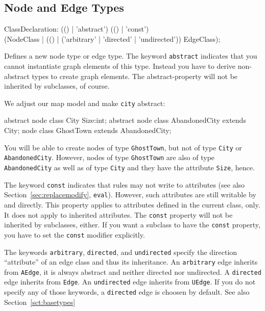 \subsection{Node and Edge Types}
\begin{rail}
  ClassDeclaration: (() | 'abstract') (() | 'const') \\
    (NodeClass | (() | ('arbitrary' | 'directed' | 'undirected')) EdgeClass);
\end{rail}
Defines a new node type or edge type.
The keyword \texttt{abstract} indicates that you cannot instantiate graph elements of this type.
Instead you have to derive non-abstract types to create graph elements.
The abstract-property will not be inherited by subclasses, of course.

\begin{example}
We adjust our map model and make \texttt{city} abstract:
\begin{grgen}
abstract node class City {
  Size:int;
}
abstract node class AbandonedCity extends City;
node class GhostTown extends AbandonedCity;
\end{grgen}
You will be able to create nodes of type \texttt{GhostTown}, but not of type \texttt{City} or \texttt{AbandonedCity}. However, nodes of type \texttt{GhostTown} are also of type \texttt{AbandonedCity} as well as of type \texttt{City} and they have the attribute \texttt{Size}, hence.
\end{example}
The keyword \texttt{const} indicates that rules may not write to attributes (see also Section~\ref{sec:replacemodify}, \texttt{eval}). However, such attributes are still writable by \LibGr{} and \GrShell{} directly. This property applies to attributes defined in the current class, only. It does not apply to inherited attributes. The \texttt{const} property will not be inherited by subclasses, either. If you want a subclass to have the \texttt{const} property, you have to set the \texttt{const} modifier explicitly.

The keywords \texttt{arbitrary}, \texttt{directed}, and \texttt{undirected} specify the direction ``attribute'' of an edge class and thus its inheritance.
An \texttt{arbitrary} edge inherits from \texttt{AEdge}, it is always abstract and neither directed nor undirected.
A \texttt{directed} edge inherits from \texttt{Edge}.
An \texttt{undirected} edge inherits from \texttt{UEdge}.
If you do not specify any of those keywords, a \texttt{directed} edge is choosen by default.
See also Section~\ref{sct:basetypes}

